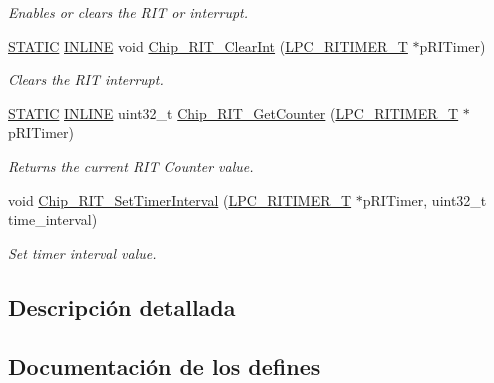 \begin{DoxyCompactItemize}
\begin{DoxyCompactList}\small\item\em Enables or clears the R\+IT or interrupt. \end{DoxyCompactList}\item 
\hyperlink{group___l_p_c___types___public___macros_ga10b2d890d871e1489bb02b7e70d9bdfb}{S\+T\+A\+T\+IC} \hyperlink{spifi__18xx__43xx_8h_a2eb6f9e0395b47b8d5e3eeae4fe0c116}{I\+N\+L\+I\+NE} void \hyperlink{group___r_i_t_i_m_e_r__18_x_x__43_x_x_ga16ba8104cee04723ddd751b99655f01d}{Chip\+\_\+\+R\+I\+T\+\_\+\+Clear\+Int} (\hyperlink{struct_l_p_c___r_i_t_i_m_e_r___t}{L\+P\+C\+\_\+\+R\+I\+T\+I\+M\+E\+R\+\_\+T} $\ast$p\+R\+I\+Timer)
\begin{DoxyCompactList}\small\item\em Clears the R\+IT interrupt. \end{DoxyCompactList}\item 
\hyperlink{group___l_p_c___types___public___macros_ga10b2d890d871e1489bb02b7e70d9bdfb}{S\+T\+A\+T\+IC} \hyperlink{spifi__18xx__43xx_8h_a2eb6f9e0395b47b8d5e3eeae4fe0c116}{I\+N\+L\+I\+NE} uint32\+\_\+t \hyperlink{group___r_i_t_i_m_e_r__18_x_x__43_x_x_ga8993e210c53f74ba84933ef5ef4b58ad}{Chip\+\_\+\+R\+I\+T\+\_\+\+Get\+Counter} (\hyperlink{struct_l_p_c___r_i_t_i_m_e_r___t}{L\+P\+C\+\_\+\+R\+I\+T\+I\+M\+E\+R\+\_\+T} $\ast$p\+R\+I\+Timer)
\begin{DoxyCompactList}\small\item\em Returns the current R\+IT Counter value. \end{DoxyCompactList}\item 
void \hyperlink{group___r_i_t_i_m_e_r__18_x_x__43_x_x_ga9473901c9e5ba4867c14597473cacf2b}{Chip\+\_\+\+R\+I\+T\+\_\+\+Set\+Timer\+Interval} (\hyperlink{struct_l_p_c___r_i_t_i_m_e_r___t}{L\+P\+C\+\_\+\+R\+I\+T\+I\+M\+E\+R\+\_\+T} $\ast$p\+R\+I\+Timer, uint32\+\_\+t time\+\_\+interval)
\begin{DoxyCompactList}\small\item\em Set timer interval value. \end{DoxyCompactList}\end{DoxyCompactItemize}


\subsection{Descripción detallada}


\subsection{Documentación de los \textquotesingle{}defines\textquotesingle{}}
